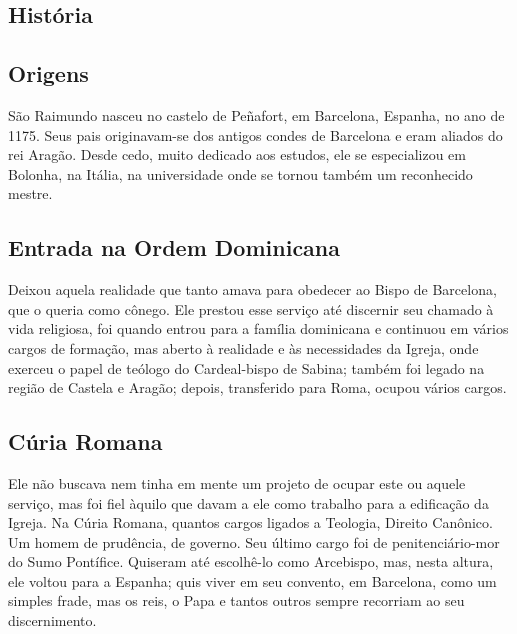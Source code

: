 \documentclass[18pt]{article}
\begin{document}
\begin{justify}

 \begin{center}
  \section{História}\label{sec:História} %
 \end{center}


\subsection*{Origens}

São Raimundo nasceu no castelo de Peñafort, em Barcelona, Espanha, no ano de 1175. Seus pais originavam-se dos antigos condes de Barcelona e eram aliados do rei Aragão. Desde cedo, muito dedicado aos estudos, ele se especializou em Bolonha, na Itália, na universidade onde se tornou também um reconhecido mestre.

\subsection*{Entrada na Ordem Dominicana}

Deixou aquela realidade que tanto amava para obedecer ao Bispo de Barcelona, que o queria como cônego. Ele prestou esse serviço até discernir seu chamado à vida religiosa, foi quando entrou para a família dominicana e continuou em vários cargos de formação, mas aberto à realidade e às necessidades da Igreja, onde exerceu o papel de teólogo do Cardeal-bispo de Sabina; também foi legado na região de Castela e Aragão; depois, transferido para Roma, ocupou vários cargos.

\subsection*{Cúria Romana}

Ele não buscava nem tinha em mente um projeto de ocupar este ou aquele serviço, mas foi fiel àquilo que davam a ele como trabalho para a edificação da Igreja. Na Cúria Romana, quantos cargos ligados a Teologia, Direito Canônico. Um homem de prudência, de governo. Seu último cargo foi de penitenciário-mor do Sumo Pontífice. Quiseram até escolhê-lo como Arcebispo, mas, nesta altura, ele voltou para a Espanha; quis viver em seu convento, em Barcelona, como um simples frade, mas os reis, o Papa e tantos outros sempre recorriam ao seu discernimento.


\end{justify}
\end{document}
